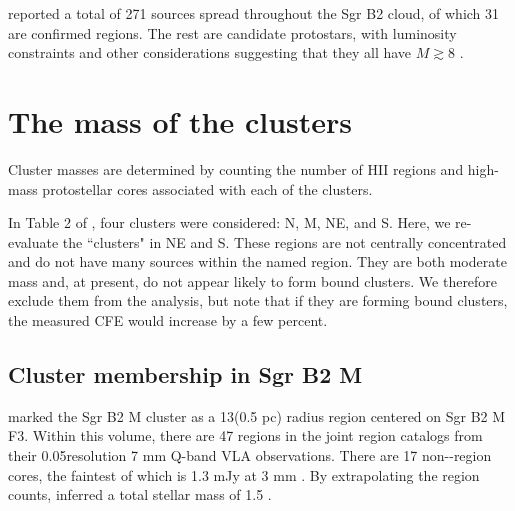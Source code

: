 \documentclass[twocolumn]{aastex61}
\begin{document}
\citet{Ginsburg2018a} reported a total of 271 sources spread throughout the Sgr
B2 cloud, of which 31 are confirmed \hii regions.  The rest are candidate
protostars, with luminosity constraints and other considerations suggesting
that they all have $M\gtrsim8$ \msun.


\section{The mass of the clusters}
Cluster masses are determined by counting the number of HII regions and high-mass
protostellar cores associated with each of the clusters.

In Table 2 of \citet{Ginsburg2018a}, four clusters were considered: N, M, NE, and
S.  Here, we re-evaluate the ``clusters" in NE and S.  These regions are not
centrally concentrated and do not have many sources within the named region.
They are both moderate mass and, at present, do not appear likely to form bound
clusters.  We therefore exclude them from the analysis, but note that if they
are forming bound clusters, the measured CFE would increase by a few percent.



\subsection{Cluster membership in Sgr B2 M}
\citet{Schmiedeke2016a} marked the Sgr B2 M cluster as a 13\arcsec  (0.5 pc) radius
region centered on Sgr B2 M F3.  Within this volume, there are 47 \hii regions
in the joint  \hii region catalogs \citep{Gaume1995a,De-Pree2015a} from their
0.05\arcsec resolution 7 mm Q-band
VLA observations.  There are 17 non-\hii-region cores, the faintest of which is
1.3 mJy at 3 mm \citep{Ginsburg2018a}.  By extrapolating the \hii region counts,
\citet{Ginsburg2018a} inferred a total stellar mass of 1.5 \msun.

% 
\end{document}
